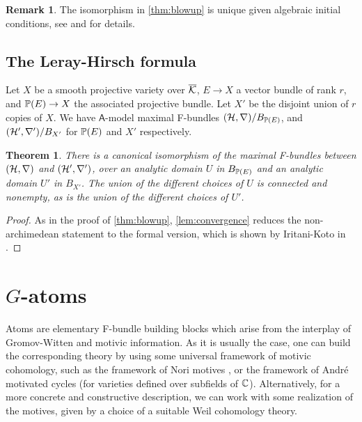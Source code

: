 \documentclass[twoside,leqno]{article}
\numberwithin{equation}{section}
\theoremstyle{plain}
\newtheorem{theorem}[equation]{Theorem}
\theoremstyle{definition}
\newtheorem{remark}[equation]{Remark}
\begin{document}
\begin{remark} \label{rem:blowup_uniqueness}
The isomorphism in \cref{thm:blowup} is unique given algebraic initial conditions, see \cite[\S 5.4]{HYZZ_Decomposition} and \cite[\S 5.8]{Iritani_blowup} for details.
\end{remark}

\subsection{The Leray-Hirsch formula} \label{ssec:LH}

Let $X$ be a smooth projective variety over $\overline{\mathcal K}$, $E \to X$ a vector bundle of rank $r$, and $\mathbb P(E) \to X$ the associated projective bundle.
Let $X'$ be the disjoint union of $r$ copies of $X$.
We have $\mathsf{A}$-model maximal F-bundles $(\mathcal H, \nabla)/B_{\mathbb P(E)}$, and $(\mathcal H', \nabla')/B_{X'}$ for $\mathbb P(E)$ and $X'$ respectively.

\begin{theorem} \label{thm:projective_bundle}
  There is a canonical isomorphism of the maximal F-bundles between $(\mathcal H, \nabla)$ and $(\mathcal H', \nabla')$, over an analytic domain $U$ in $B_{\mathbb P(E)}$ and an analytic domain $U'$ in $B_{X'}$.
  The union of the different choices of $U$ is connected and nonempty, as is the union of the different choices of $U'$.
\end{theorem}

\begin{proof}
  As in the proof of \cref{thm:blowup}, \cref{lem:convergence} reduces the non-archimedean statement to the formal version, which is shown by Iritani-Koto in \cite[Theorem 5.1]{Iritani_Koto}.
\end{proof}

\section{\texorpdfstring{$G$}{G}-atoms} \label{sec:Gatoms}

Atoms are elementary F-bundle building blocks which arise from the interplay of Gromov-Witten and motivic information. As it is usually the case, one can build the corresponding theory by using some universal framework of motivic cohomology, such as the framework of Nori motives  \cite{nori-tifr,hms-periods.nori}, or the framework of Andr\'{e} motivated cycles \cite{Andre_Pour_une_theorie_inconditionnelle_des_motifs,Andre-book} (for varieties defined over subfields of $\mathbb C$). Alternatively, for a more concrete and constructive description, we can work with some realization of the motives,  given by a choice of a suitable Weil cohomology theory.
\end{document}
